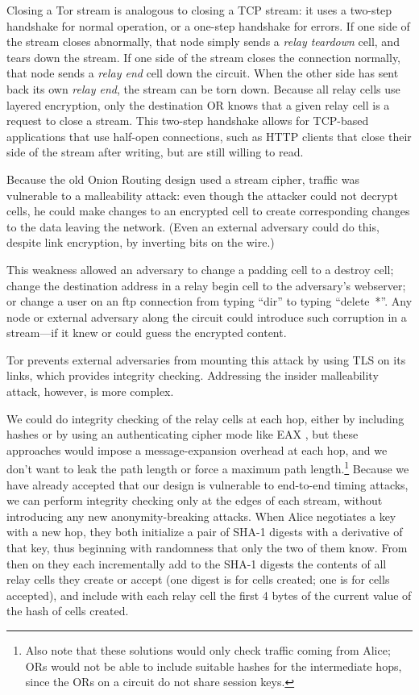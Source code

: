 \documentclass[times,10pt,twocolumn]{article}
\begin{document}
Closing a Tor stream is analogous to closing a TCP stream: it uses a
two-step handshake for normal operation, or a one-step handshake for
errors. If one side of the stream closes abnormally, that node simply
sends a \emph{relay teardown} cell, and tears down the stream. If one
side of the stream closes the connection normally, that node sends a
\emph{relay end} cell down the circuit. When the other side has sent
back its own \emph{relay end}, the stream can be torn down.  Because
all relay cells use layered encryption, only the destination OR knows
that a given relay cell is a request to close a stream.  This two-step
handshake allows for TCP-based applications that use half-open
connections, such as HTTP clients that close their side of the stream
after writing, but are still willing to read.


Because the old Onion Routing design used a stream cipher, traffic was
vulnerable to a malleability attack: even though the attacker could not
decrypt cells, he could make changes to an encrypted
cell to create corresponding changes to the data leaving the network.
(Even an external adversary could do this, despite link encryption, by
inverting bits on the wire.)

This weakness allowed an adversary to change a padding cell to a destroy
cell; change the destination address in a relay begin cell to the
adversary's webserver; or change a user on an ftp connection from
typing ``dir'' to typing ``delete~*''. Any node or external adversary
along the circuit could introduce such corruption in a stream---if it
knew or could guess the encrypted content.

Tor prevents external adversaries from mounting this attack by
using TLS on its links, which provides integrity checking.
Addressing the insider malleability attack, however, is
more complex.

We could do integrity checking of the relay cells at each hop, either
by including hashes or by using an authenticating cipher mode like EAX
\cite{eax}, but these approaches would impose a 
message-expansion overhead at each hop, and we don't want to
leak the path length or force a maximum path length.\footnote{
  Also note that these solutions would only check traffic coming from
  Alice; ORs would not be able to include suitable hashes for the
  intermediate hops, since the ORs on a circuit do not share session
  keys.}
Because we have already accepted that our design is vulnerable to end-to-end
timing attacks, we can perform integrity checking only at the edges of
each stream, without introducing any new anonymity-breaking attacks. When Alice
negotiates a key with a new hop, they both initialize a pair of SHA-1 
digests with a derivative of that key,
thus beginning with randomness that only the two of them know. From
then on they each incrementally add to the SHA-1 digests the contents of 
all relay cells they create or accept (one digest is for cells
created; one is for cells accepted), and include with each relay cell
the first 4 bytes of the current value of the hash of cells created.
\end{document}
